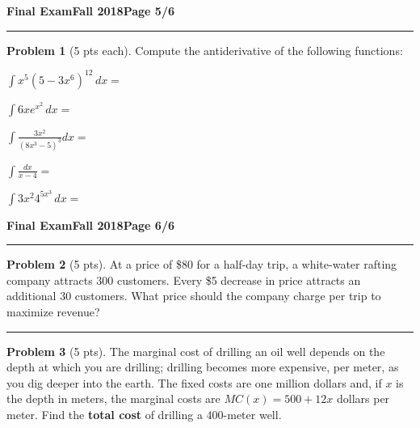 \documentclass[12pt]{article}
\theoremstyle{definition}
\newtheorem{problem}{Problem}
\begin{document}
\newpage

\hfill{\large\bf Final Exam}\hfill{\large\bf Fall 2018}\hfill{\large\bf Page 5/6}\hrule

\bigskip 

\begin{problem}[5 pts each]
Compute the antiderivative of the following functions:
\item $\displaystyle{\int x^5 (5 - 3x^6)^{12}\, dx =}$
\vspace{2cm}
\item $\displaystyle{\int  6xe^{x^2} \, dx =}$
\vspace{2cm}
\item $\displaystyle{\int \frac{3x^2}{(8x^3-5)^3} dx =}$
\vspace{4cm}
\item $\displaystyle{\int \frac{dx}{x-4} =}$
\vspace{4cm}
\item $\displaystyle{\int 3x^2 4^{5x^3}\, dx =}$
\end{problem}

\newpage

\hfill{\large\bf Final Exam}\hfill{\large\bf Fall 2018}\hfill{\large\bf Page 6/6}\hrule

\bigskip  

\begin{problem}[5 pts]
At a price of \$80 for a half-day trip, a white-water rafting company attracts 300 customers.  Every \$5 decrease in price attracts an additional 30 customers.  What price should the company charge per trip to maximize revenue?
\vspace{10cm}
\end{problem}
\hrule

\begin{problem}[5 pts]
The marginal cost of drilling an oil well depends on the depth at which you are drilling; drilling becomes more expensive, per meter, as you dig deeper into the earth.  The fixed costs are one million dollars and, if $x$ is the depth in meters, the marginal costs are $MC(x) = 500 + 12x$ dollars per meter.  Find the \textbf{total cost} of drilling a 400-meter well.
\end{problem}
\end{document}
